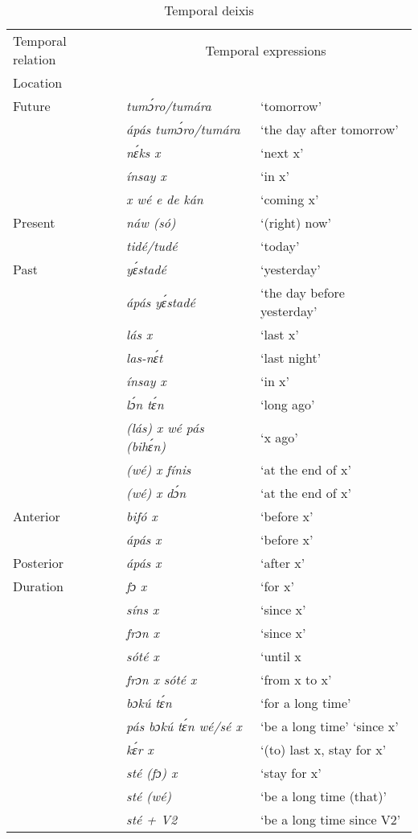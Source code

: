 \begin{table}
\caption{Temporal deixis}
\label{tab:key:8.6}

\begin{tabularx}{\textwidth}{lXX}
\lsptoprule

Temporal relation & \multicolumn{2}{c}{Temporal expressions}\\
Location &  & \\
\midrule 
  Future & \itshape tumɔ́ro/tumára & ‘tomorrow’\\
& \itshape ápás tumɔ́ro/tumára & ‘the day after tomorrow’\\
& \itshape nɛ́ks x & ‘next x’\\
& \itshape ínsay x & ‘in x’\\
& \itshape x wé e de kán & ‘coming x’\\

\tablevspace
Present & \itshape náw (só) & ‘(right) now’\\
& \itshape tidé/tudé & ‘today’\\

\tablevspace
Past & \itshape yɛ́stadé & ‘yesterday’\\
& \itshape ápás yɛ́stadé & ‘the day before yesterday’\\
& \itshape lás x & ‘last x’\\
& \itshape las-nɛ́t & ‘last night’\\
& \itshape ínsay x & ‘in x’\\
& \itshape lɔ́n tɛ́n & ‘long ago’\\
& \itshape (lás) x wé pás (bihɛ́n) & ‘x ago’\\
& \itshape (wé) x fínis & ‘at the end of x’\\
& \itshape (wé) x dɔ́n & ‘at the end of x’\\

\tablevspace
Anterior & \itshape bifó x & ‘before x’\\
& \itshape ápás x & ‘before x’\\

\tablevspace
Posterior & \itshape ápás x & ‘after x’\\

\tablevspace
Duration & \itshape fɔ x & ‘for x’\\
& \itshape síns x & ‘since x’\\
& \itshape frɔn x & ‘since x’\\
& \itshape sóté x & ‘until x\\
& \itshape frɔn x sóté x & ‘from x to x’\\
& \itshape bɔkú tɛ́n & ‘for a long time’\\
& \itshape pás bɔkú tɛ́n wé/sé x & ‘be a long time’ ‘since x’\\
& \itshape kɛ́r x & ‘(to) last x, stay for x’\\
& \itshape sté (fɔ) x & ‘stay for x’\\
& \itshape sté (wé) & ‘be a long time (that)’\\
& \itshape sté + V2 & ‘be a long time since V2’\\


\end{tabularx}
\end{table}
